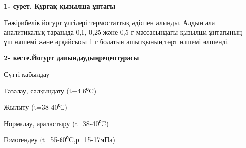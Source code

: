 {\bfseries 1- сурет. Құрғақ қызылша ұнтағы}

Тәжірибелік йогурт үлгілері термостаттық әдіспен алынды. Алдын ала
аналитикалық таразыда 0,1, 0,25 және 0,5 г массасындағы қызылша
ұнтағының үш өлшемі және әрқайсысы 1 г болатын ашытқының төрт өлшемі
өлшенді.

{\bfseries 2- кесте.Йогурт дайындаудыңрецептурасы}


Сүтті қабылдау

Тазалау, салқындату (t=4-6⁰C)

Жылыту (t=38-40⁰С)

Нормалау, араластыру (t=38-40⁰C)

Гомогендеу (t=55-60⁰C,р=15-17мПа)

